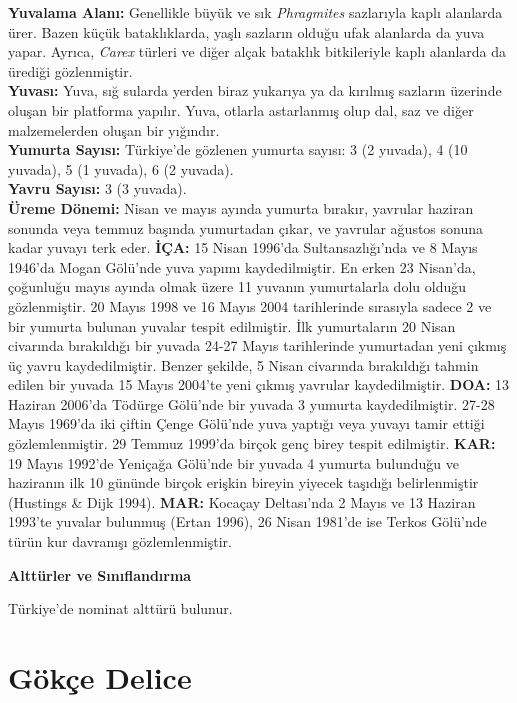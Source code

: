 \documentclass[
  letterpaper,
  DIV=11,
  numbers=noendperiod]{scrreprt}
\begin{document}
\textbf{Yuvalama Alanı:} Genellikle büyük ve sık \emph{Phragmites}
sazlarıyla kaplı alanlarda ürer. Bazen küçük bataklıklarda, yaşlı
sazların olduğu ufak alanlarda da yuva yapar. Ayrıca, \emph{Carex}
türleri ve diğer alçak bataklık bitkileriyle kaplı alanlarda da ürediği
gözlenmiştir.\\
\textbf{Yuvası:} Yuva, sığ sularda yerden biraz yukarıya ya da kırılmış
sazların üzerinde oluşan bir platforma yapılır. Yuva, otlarla
astarlanmış olup dal, saz ve diğer malzemelerden oluşan bir yığındır.\\
\textbf{Yumurta Sayısı:} Türkiye'de gözlenen yumurta sayısı: 3 (2
yuvada), 4 (10 yuvada), 5 (1 yuvada), 6 (2 yuvada).\\
\textbf{Yavru Sayısı:} 3 (3 yuvada).\\
\textbf{Üreme Dönemi:} Nisan ve mayıs ayında yumurta bırakır, yavrular
haziran sonunda veya temmuz başında yumurtadan çıkar, ve yavrular
ağustos sonuna kadar yuvayı terk eder. \textbf{İÇA:} 15 Nisan 1996'da
Sultansazlığı'nda ve 8 Mayıs 1946'da Mogan Gölü'nde yuva yapımı
kaydedilmiştir. En erken 23 Nisan'da, çoğunluğu mayıs ayında olmak üzere
11 yuvanın yumurtalarla dolu olduğu gözlenmiştir. 20 Mayıs 1998 ve 16
Mayıs 2004 tarihlerinde sırasıyla sadece 2 ve bir yumurta bulunan
yuvalar tespit edilmiştir. İlk yumurtaların 20 Nisan civarında
bırakıldığı bir yuvada 24-27 Mayıs tarihlerinde yumurtadan yeni çıkmış
üç yavru kaydedilmiştir. Benzer şekilde, 5 Nisan civarında bırakıldığı
tahmin edilen bir yuvada 15 Mayıs 2004'te yeni çıkmış yavrular
kaydedilmiştir. \textbf{DOA:} 13 Haziran 2006'da Tödürge Gölü'nde bir
yuvada 3 yumurta kaydedilmiştir. 27-28 Mayıs 1969'da iki çiftin Çenge
Gölü'nde yuva yaptığı veya yuvayı tamir ettiği gözlemlenmiştir. 29
Temmuz 1999'da birçok genç birey tespit edilmiştir. \textbf{KAR:} 19
Mayıs 1992'de Yeniçağa Gölü'nde bir yuvada 4 yumurta bulunduğu ve
haziranın ilk 10 gününde birçok erişkin bireyin yiyecek taşıdığı
belirlenmiştir (Hustings \& Dijk 1994). \textbf{MAR:} Kocaçay
Deltası'nda 2 Mayıs ve 13 Haziran 1993'te yuvalar bulunmuş (Ertan 1996),
26 Nisan 1981'de ise Terkos Gölü'nde türün kur davranışı
gözlemlenmiştir.

\textbf{Alttürler ve Sınıflandırma}

Türkiye'de nominat alttürü bulunur.

\section{Gökçe Delice}\label{guxf6kuxe7e-delice}
\end{document}
